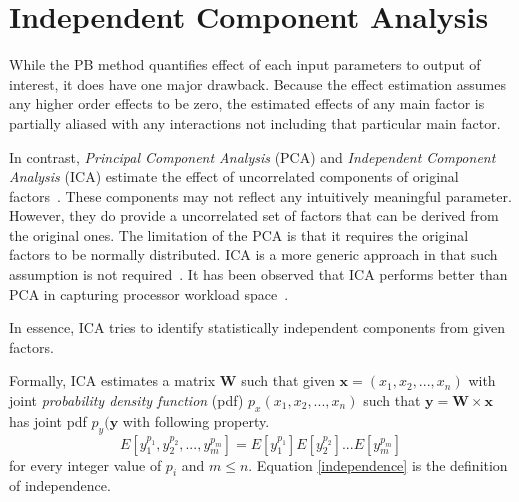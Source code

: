 \section{Independent Component Analysis}
\label{BG_ICA}
While the PB method quantifies effect of each input parameters to output of interest, it does have one major drawback. 
Because the effect estimation assumes any higher order effects to be zero, the estimated effects of any main factor is partially aliased with any interactions not including that particular main factor. 

In contrast, \emph{Principal Component Analysis} (PCA) and \emph{Independent Component Analysis} (ICA) estimate the effect of uncorrelated components of original factors~\cite{stone:2004}. 
These components may not reflect any intuitively meaningful parameter. 
However, they do provide a uncorrelated set of factors that can be derived from the original ones. 
The limitation of the PCA is that it requires the original factors to be normally distributed. 
ICA is a more generic approach in that such assumption is not required~\cite{christopoulos:2008}. 
It has been observed that ICA performs better than PCA in capturing processor workload space~\cite{eeckhout:2005}. 

In essence, ICA tries to identify statistically independent components from given factors. 

Formally, ICA estimates a matrix $\mathbf{W}$ such that given $\mathbf{x}=(x_1, x_2, ..., x_n)$ with joint \emph{probability density function} (pdf) $p_x(x_1, x_2, ..., x_n)$ such that $\mathbf{y}=\mathbf{W} \times \mathbf{x}$ has joint pdf $p_y(\mathbf{y}$ with following property.
\begin{equation}\label{independence}
E[y_1^{p_1}, y_2^{p_2}, ..., y_m^{p_m}]=E[y_1^{p_1}]E[y_2^{p_2}]...E[y_m^{p_m}]
\end{equation}
for every integer value of $p_i$ and $m \le n$. Equation \ref{independence} is the definition of independence.
